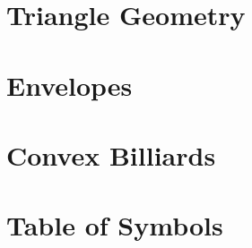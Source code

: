\chapter{Triangle Geometry}
\label{app:app-triangle}


\chapter{Envelopes}
\label{app:app-envelope}


\chapter{Convex Billiards}
\label{app:app-convex}
  

\chapter{Table of Symbols}
\label{app:app-symbols}
